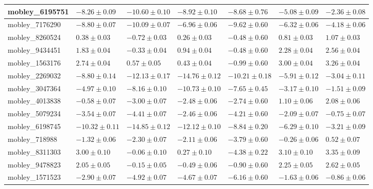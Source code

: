 \documentclass{article}
\begin{document}
\begin{landscape}
\begin{longtable}{|l{3.0cm}|l{3.0cm}|l{3.2cm}|l{3.6cm}|l{3.0cm}|l{3.0cm}|l{3.0cm}|}
mobley\_6195751	&	$	-8.26	\pm	0.09	$	&	$	-10.60	\pm	0.10	$	&	$	-8.92	\pm	0.10	$	&	$	-8.68	\pm	0.76	$	&	$	-5.08	\pm	0.09	$	&	$	-2.36	\pm	0.08	$	\\ \hline
mobley\_7176290	&	$	-8.80	\pm	0.07	$	&	$	-10.09	\pm	0.07	$	&	$	-6.96	\pm	0.06	$	&	$	-9.62	\pm	0.60	$	&	$	-6.32	\pm	0.06	$	&	$	-4.18	\pm	0.06	$	\\ \hline
mobley\_8260524	&	$	0.38	\pm	0.03	$	&	$	-0.72	\pm	0.03	$	&	$	0.26	\pm	0.03	$	&	$	-0.48	\pm	0.60	$	&	$	0.81	\pm	0.03	$	&	$	1.07	\pm	0.03	$	\\ \hline
mobley\_9434451	&	$	1.83	\pm	0.04	$	&	$	-0.33	\pm	0.04	$	&	$	0.94	\pm	0.04	$	&	$	-0.48	\pm	0.60	$	&	$	2.28	\pm	0.04	$	&	$	2.56	\pm	0.04	$	\\ \hline
mobley\_1563176	&	$	2.74	\pm	0.04	$	&	$	0.57	\pm	0.05	$	&	$	0.43	\pm	0.04	$	&	$	-0.99	\pm	0.60	$	&	$	3.00	\pm	0.04	$	&	$	3.26	\pm	0.04	$	\\ \hline
mobley\_2269032	&	$	-8.80	\pm	0.14	$	&	$	-12.13	\pm	0.17	$	&	$	-14.76	\pm	0.12	$	&	$	-10.21	\pm	0.18	$	&	$	-5.91	\pm	0.12	$	&	$	-3.04	\pm	0.11	$	\\ \hline
mobley\_3047364	&	$	-4.97	\pm	0.10	$	&	$	-8.16	\pm	0.10	$	&	$	-10.73	\pm	0.10	$	&	$	-7.65	\pm	0.45	$	&	$	-3.17	\pm	0.10	$	&	$	-1.51	\pm	0.09	$	\\ \hline
mobley\_4013838	&	$	-0.58	\pm	0.07	$	&	$	-3.00	\pm	0.07	$	&	$	-2.48	\pm	0.06	$	&	$	-2.74	\pm	0.60	$	&	$	1.10	\pm	0.06	$	&	$	2.08	\pm	0.06	$	\\ \hline
mobley\_5079234	&	$	-3.54	\pm	0.07	$	&	$	-4.41	\pm	0.07	$	&	$	-2.46	\pm	0.06	$	&	$	-4.21	\pm	0.60	$	&	$	-2.09	\pm	0.07	$	&	$	-0.75	\pm	0.07	$	\\ \hline
mobley\_6198745	&	$	-10.32	\pm	0.11	$	&	$	-14.85	\pm	0.12	$	&	$	-12.12	\pm	0.10	$	&	$	-8.84	\pm	0.20	$	&	$	-6.29	\pm	0.10	$	&	$	-3.21	\pm	0.09	$	\\ \hline
mobley\_718988	&	$	-1.32	\pm	0.06	$	&	$	-2.30	\pm	0.07	$	&	$	-2.11	\pm	0.06	$	&	$	-3.79	\pm	0.60	$	&	$	-0.26	\pm	0.06	$	&	$	0.52	\pm	0.07	$	\\ \hline
mobley\_8311303	&	$	3.00	\pm	0.10	$	&	$	-0.06	\pm	0.10	$	&	$	0.27	\pm	0.10	$	&	$	-4.38	\pm	0.22	$	&	$	3.10	\pm	0.10	$	&	$	3.35	\pm	0.09	$	\\ \hline
mobley\_9478823	&	$	2.05	\pm	0.05	$	&	$	-0.15	\pm	0.05	$	&	$	-0.49	\pm	0.06	$	&	$	-0.90	\pm	0.60	$	&	$	2.25	\pm	0.05	$	&	$	2.62	\pm	0.05	$	\\ \hline
mobley\_1571523	&	$	-2.90	\pm	0.07	$	&	$	-4.92	\pm	0.07	$	&	$	-4.67	\pm	0.07	$	&	$	-6.16	\pm	0.60	$	&	$	-1.63	\pm	0.06	$	&	$	-0.86	\pm	0.06	$	\\ \hline

\end{longtable}
\end{landscape}
\end{document}
